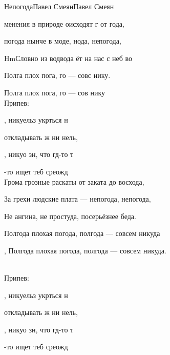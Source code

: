 \documentclass[11pt,a5paper]{book}
\newcommand{\SBChorusTagg}{Припев}
\renewcommand{\tt}{\indent \indent}
\begin{document}
\begin{song}{Непогода}{}{Павел Смеян}{Павел Смеян}{}{}

менения в природе оисходят г от года,\par
{}погода нынче в моде, нода, непогода,\par
\Ch{}Hm{Слов}но из водвода ёт на нас с неб во\par
Полга плох пога, го — совс нику.\par
Полга плох пога, го — сов нику\\


\SBChorusTagg:\par
{}, никуельз укрться н\par
{} откладывать ж ни нель, \par
{}, никуо зн, что гд-то т\par
{}-то ищет теб среожд \\


Грома грозные раскаты от заката до восхода,\par
За грехи людские плата — непогода, непогода,\par
Не ангина, не простуда, посерьёзнее беда.\par
Полгода плохая погода, полгода — совсем никуда\par,
Полгода плохая погода, полгода — совсем никуда.\\\


\SBChorusTagg:\par
{}, никуельз укрться н\par
{} откладывать ж ни нель, \par
{}, никуо зн, что гд-то т\par
{}-то ищет теб среожд \\


\end{song}
\end{document}
